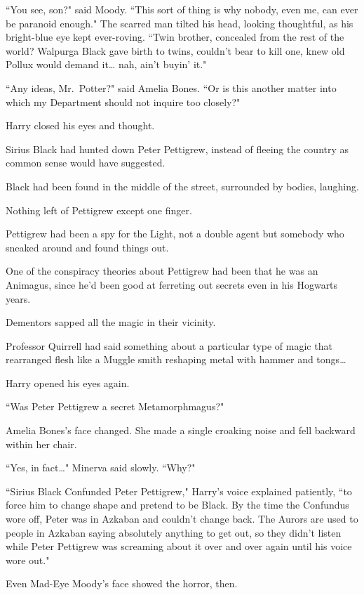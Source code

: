 ``You see, son?" said Moody. ``This sort of thing is why nobody, even me, can ever be paranoid enough." The scarred man tilted his head, looking thoughtful, as his bright-blue eye kept ever-roving. ``Twin brother, concealed from the rest of the world? Walpurga Black gave birth to twins, couldn't bear to kill one, knew old Pollux would demand it{\ldots} nah, ain't buyin' it."

``Any ideas, Mr.~Potter?" said Amelia Bones. ``Or is this another matter into which my Department should not inquire too closely?"

Harry closed his eyes and thought.

Sirius Black had hunted down Peter Pettigrew, instead of fleeing the country as common sense would have suggested.

Black had been found in the middle of the street, surrounded by bodies, laughing.

Nothing left of Pettigrew except one finger.

Pettigrew had been a spy for the Light, not a double agent but somebody who sneaked around and found things out.

One of the conspiracy theories about Pettigrew had been that he was an Animagus, since he'd been good at ferreting out secrets even in his Hogwarts years.

Dementors sapped all the magic in their vicinity.

Professor Quirrell had said something about a particular type of magic that rearranged flesh like a Muggle smith reshaping metal with hammer and tongs{\ldots}

Harry opened his eyes again.

``Was Peter Pettigrew a secret Metamorphmagus?"

Amelia Bones's face changed. She made a single croaking noise and fell backward within her chair.

``Yes, in fact{\ldots}" Minerva said slowly. ``Why?"

``Sirius Black Confunded Peter Pettigrew," Harry's voice explained patiently, ``to force him to change shape and pretend to be Black. By the time the Confundus wore off, Peter was in Azkaban and couldn't change back. The Aurors are used to people in Azkaban saying absolutely anything to get out, so they didn't listen while Peter Pettigrew was screaming about it over and over again until his voice wore out."

Even Mad-Eye Moody's face showed the horror, then.

